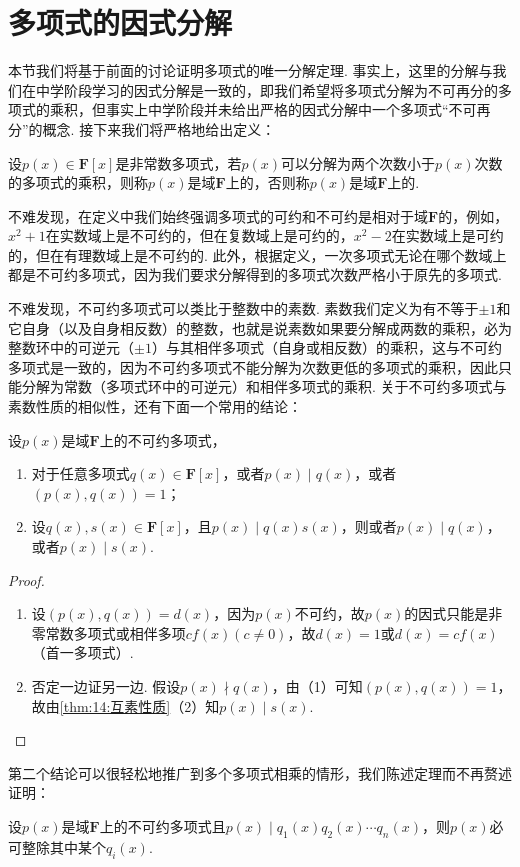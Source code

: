 \section{多项式的因式分解}
本节我们将基于前面的讨论证明多项式的唯一分解定理. 事实上，这里的分解与我们在中学阶段学习的因式分解是一致的，即我们希望将多项式分解为不可再分的多项式的乘积，但事实上中学阶段并未给出严格的因式分解中一个多项式``不可再分''的概念. 接下来我们将严格地给出定义：
\begin{definition}
    设$p(x)\in\mathbf{F}[x]$是非常数多项式，若$p(x)$可以分解为两个次数小于$p(x)$次数的多项式的乘积，则称$p(x)$是域$\mathbf{F}$上的，否则称$p(x)$是域$\mathbf{F}$上的.
\end{definition}

不难发现，在定义中我们始终强调多项式的可约和不可约是相对于域$\mathbf{F}$的，例如，$x^2+1$在实数域上是不可约的，但在复数域上是可约的，$x^2-2$在实数域上是可约的，但在有理数域上是不可约的. 此外，根据定义，一次多项式无论在哪个数域上都是不可约多项式，因为我们要求分解得到的多项式次数严格小于原先的多项式.

不难发现，不可约多项式可以类比于整数中的素数. 素数我们定义为有不等于$\pm 1$和它自身（以及自身相反数）的整数，也就是说素数如果要分解成两数的乘积，必为整数环中的可逆元（$\pm 1$）与其相伴多项式（自身或相反数）的乘积，这与不可约多项式是一致的，因为不可约多项式不能分解为次数更低的多项式的乘积，因此只能分解为常数（多项式环中的可逆元）和相伴多项式的乘积. 关于不可约多项式与素数性质的相似性，还有下面一个常用的结论：
\begin{theorem} \label{thm:14:不可约多项式的性质}
    设$p(x)$是域$\mathbf{F}$上的不可约多项式，
    \begin{enumerate}
        \item 对于任意多项式$q(x)\in\mathbf{F}[x]$，或者$p(x)\mid q(x)$，或者$(p(x),q(x))=1$；
        \item 设$q(x),s(x)\in\mathbf{F}[x]$，且$p(x)\mid q(x)s(x)$，则或者$p(x)\mid q(x)$，或者$p(x)\mid s(x)$.
    \end{enumerate}
\end{theorem}
\begin{proof}
    \begin{enumerate}
        \item 设$(p(x),q(x))=d(x)$，因为$p(x)$不可约，故$p(x)$的因式只能是非零常数多项式或相伴多项$cf(x)(c\neq 0)$，故$d(x)=1$或$d(x)=cf(x)$（首一多项式）.
        \item 否定一边证另一边. 假设$p(x)\nmid q(x)$，由（1）可知$(p(x),q(x))=1$，故由\autoref{thm:14:互素性质}（2）知$p(x)\mid s(x)$.
    \end{enumerate}
\end{proof}
第二个结论可以很轻松地推广到多个多项式相乘的情形，我们陈述定理而不再赘述证明：
\begin{corollary} \label{cor:14:不可约多项式的性质推广}
    设$p(x)$是域$\mathbf{F}$上的不可约多项式且$p(x)\mid q_1(x)q_2(x)\cdots q_n(x)$，则$p(x)$必可整除其中某个$q_i(x)$.
\end{corollary}

